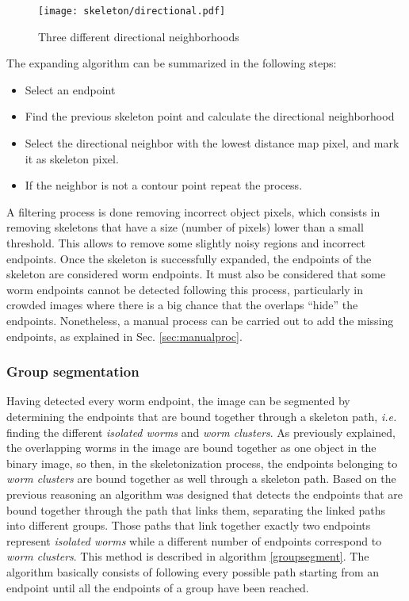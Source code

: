 \begin{figure}[h t b p ! H]
 \centering
   \texttt{[image: skeleton/directional.pdf]}
 \caption{Three different directional neighborhoods}
 \label{fig:directional}
\end{figure}

The expanding algorithm can be summarized in the following steps:
\begin{itemize}
\item Select an endpoint
\item Find the previous skeleton point and calculate the directional neighborhood
\item Select the directional neighbor with the lowest distance map pixel,
  and mark it as skeleton pixel.
\item If the neighbor is not a contour point repeat the process.
\end{itemize}

A filtering process is done removing incorrect object pixels, which consists in
removing skeletons that have a size (number of pixels) lower than a small 
threshold. This allows to remove some slightly noisy regions and incorrect endpoints.
Once the skeleton is successfully expanded, the endpoints of the skeleton are considered
worm endpoints. 
It must also be considered that some worm endpoints cannot be detected following this 
process, particularly in crowded images where there is a big chance that the
overlaps ``hide'' the endpoints. Nonetheless, a manual process can 
be carried out to add the missing endpoints, as explained in Sec. \ref{sec:manualproc}.


\subsubsection*{Group segmentation}

Having detected every worm endpoint, the image can be segmented by determining
the endpoints that are bound together through a skeleton path, \emph{i.e.} finding 
the different \emph{isolated worms} and \emph{worm clusters}.
As previously explained, the overlapping worms in the image are bound together
as one object in the binary image, so then, in the skeletonization
process, the endpoints belonging to \emph{worm clusters} are bound together as well through a skeleton path.
Based on the previous reasoning an algorithm was designed that detects the endpoints 
that are bound together through the path that links them, separating the 
linked paths into different groups. Those paths that link together exactly two
endpoints represent \emph{isolated worms} while a different number of endpoints
correspond to \emph{worm clusters}.
This method is described in algorithm \ref{groupsegment}. The algorithm basically consists of following every
possible path starting from an endpoint until all the endpoints of a 
group have been reached. 

